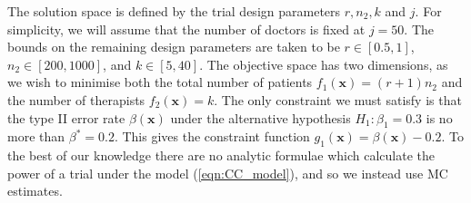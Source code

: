 \documentclass{article} %
\begin{document}
The solution space is defined by the trial design parameters $r, n_{2}, k$ and $j$. For simplicity, we will assume that the number of doctors is fixed at $j = 50$. The bounds on the remaining design parameters are taken to be $r \in [0.5, 1]$, $n_{2} \in [200, 1000]$, and $k \in [5, 40]$. The objective space has two dimensions, as we wish to minimise both the total number of patients $f_{1}(\mathbf{x}) = (r+1)n_{2}$ and the number of therapists $f_{2}(\mathbf{x}) = k$. The only constraint we must satisfy is that the type II error rate $\beta(\mathbf{x})$ under the alternative hypothesis $H_{1}: \beta_{1} = 0.3$ is no more than $\beta^{*} = 0.2$. This gives the constraint function $g_{1}(\mathbf{x}) = \beta(\mathbf{x}) - 0.2$. To the best of our knowledge there are no analytic formulae which calculate the power of a trial under the model (\ref{eqn:CC_model}), and so we instead use MC estimates. 




\end{document}
